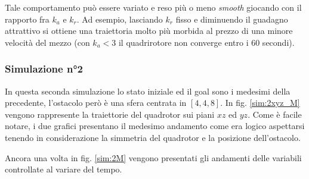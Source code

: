 \documentclass[a4paper,10pt]{article}
\begin{document}
Tale comportamento può essere variato e reso più o meno \emph{smooth} giocando con il rapporto fra $k_a$ e $k_r$. Ad esempio, lasciando $k_r$ fisso e diminuendo il guadagno attrattivo si ottiene una traiettoria molto più morbida al prezzo di una minore velocità del mezzo (con $k_a < 3$ il quadrirotore non converge entro i 60 secondi).

\subsubsection*{Simulazione n°2}
In questa seconda simulazione lo stato iniziale ed il goal sono i medesimi della precedente, l'ostacolo però è una sfera centrata in $[4, 4, 8]$. In fig. \ref{sim:2xyz_M} vengono rappresente la traiettorie del quadrotor sui piani $xz$ ed $yz$. Come è facile notare, i due grafici presentano il medesimo andamento come era logico aspettarsi tenendo in considerazione la simmetria del quadrotor e la posizione dell'ostacolo.

Ancora una volta in fig. \ref{sim:2M} vengono presentati gli andamenti delle variabili controllate al variare del tempo.
\end{document}
